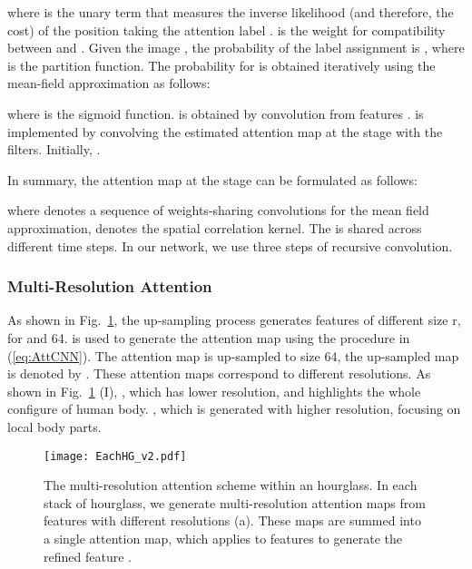 \documentclass[10pt,twocolumn,letterpaper]{article}
\begin{document}
where  is the unary term that measures the inverse likelihood (and therefore, the cost) of the position
 taking the attention label .  is the weight for compatibility between  and . Given the image , the probability of the label assignment   is  , where  is the partition function. 
The probability for  is obtained iteratively using the mean-field approximation as follows:

where  is the sigmoid function. 
 is obtained by convolution from features .  is implemented by convolving the estimated attention map   at the stage  with the filters.  Initially, .

In summary, the attention map  at the stage  can be formulated as follows:

where  denotes a sequence of weights-sharing convolutions for the mean field approximation, 
 denotes the spatial correlation kernel. 
The  is shared across different time steps.
In our network, we use three steps of recursive convolution.



\vspace{-1em}
\subsubsection{Multi-Resolution Attention}
\label{Sec:Context}






As shown in Fig.~\ref{fig:multi-resolution}, the up-sampling process generates features of different size r, \ie  for  and 64. 
 is used to generate the attention map  using the procedure in (\ref{eq:AttCNN}). 
The attention map  is up-sampled to size 64, the up-sampled map is denoted by . 
These attention maps correspond to different resolutions. As shown in Fig.~\ref{fig:multi-resolution} (I), , which has lower resolution, and highlights the whole configure of human body.  
, which is generated with higher resolution, focusing on local body parts. 

\begin{figure} 
\begin{center}
\texttt{[image: EachHG\_v2.pdf]}
\end{center}
	\vspace{-1.5em}
   \caption{\small The multi-resolution attention scheme within an hourglass. 
In each stack of hourglass, we generate multi-resolution attention maps from features with different resolutions (a). 
   These maps are summed into a single attention map, which applies to features  to generate the refined feature .  
   }
   	\vspace{-1.5em}
\label{fig:multi-resolution}
\end{figure}
\end{document}
